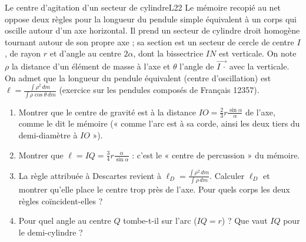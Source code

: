 \documentclass[11pt,a4paper]{article}
\begin{document}
\begin{exercice}{Le centre d'agitation d'un secteur de cylindre}{L2}{2}
Le mémoire recopié au net oppose deux règles pour la longueur du pendule simple
équivalent à un corps qui oscille autour d'un axe horizontal. Il prend un secteur
de cylindre droit homogène tournant autour de son propre axe ; sa section est un
secteur de cercle de centre $I$, de rayon $r$ et d'angle au centre $2\alpha$, dont
la bissectrice $IN$ est verticale. On note $\rho$ la distance d'un élément de masse
à l'axe et $\theta$ l'angle de $\vec{I\,\cdot}$ avec la verticale. On admet que la
longueur du pendule équivalent (centre d'oscillation) est
$\ell = \frac{\int\rho^2\,dm}{\int\rho\cos\theta\,dm}$ (exercice sur les pendules
composés de Français 12357).


\begin{enumerate}
\item Montrer que le centre de gravité est à la distance
  $IO = \frac23 r\frac{\sin\alpha}{\alpha}$ de l'axe, comme le dit le mémoire
  (« comme l'arc est à sa corde, ainsi les deux tiers du demi-diamètre à $IO$ »).
\item Montrer que $\ell = IQ = \frac34 r\frac{\alpha}{\sin\alpha}$ : c'est le
  « centre de percussion » du mémoire.
\item La règle attribuée à Descartes revient à
  $\ell_D = \frac{\int\rho^2\,dm}{\int\rho\,dm}$. Calculer $\ell_D$ et montrer qu'elle
  place le centre trop près de l'axe. Pour quels corps les deux règles
  coïncident-elles ?
\item Pour quel angle au centre $Q$ tombe-t-il sur l'arc ($IQ = r$) ? Que vaut $IQ$
  pour le demi-cylindre ?
\end{enumerate}
\end{exercice}
\end{document}
